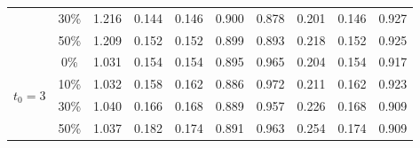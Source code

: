 \documentclass[12pt]{article}
\begin{document}
\begin{table}[H]
\begin{tabular}{|c|c|c|c|c|c|c|c|c|c|}
			& 30\% & 1.216 & 0.144 & 0.146 & 0.900 & 0.878 & 0.201 & 0.146 & 0.927 \\
			& 50\% & 1.209 & 0.152 & 0.152 & 0.899 & 0.893 & 0.218 & 0.152 & 0.925 \\
			\hline
			\multirow{4}{*}{$t_0=3$} & 0\% & 1.031 & 0.154 & 0.154 & 0.895 & 0.965 & 0.204 & 0.154 & 0.917 \\
			& 10\% & 1.032 & 0.158 & 0.162 & 0.886 & 0.972 & 0.211 & 0.162 & 0.923 \\
			& 30\% & 1.040 & 0.166 & 0.168 & 0.889 & 0.957 & 0.226 & 0.168 & 0.909 \\
			& 50\% & 1.037 & 0.182 & 0.174 & 0.891 & 0.963 & 0.254 & 0.174 & 0.909 \\
			\hline
		\end{tabular}
	\end{table}
	
\end{document}

